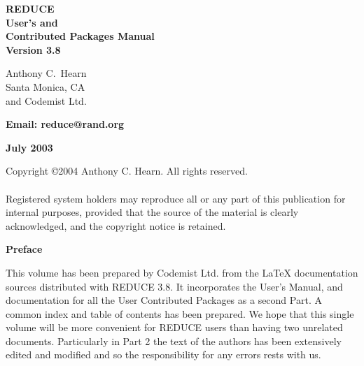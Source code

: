 \documentclass[11pt,letterpaper]{book}
\newcommand{\REDUCE}{REDUCE}
\begin{document}
\pagestyle{empty}

\vspace*{2.0in}
\begin{center}

{\Huge\bf {\REDUCE}} \\ [0.2cm]
{\LARGE\bf User's and \\
  Contributed Packages Manual\vspace{0.4cm} \\
  Version 3.8}

\vspace{0.5in}\large\bf

Anthony C.\ Hearn \\
Santa Monica, CA \\
and Codemist Ltd.

\vspace{0.1in}

\bf Email: reduce@rand.org

\vspace{0.5in}

\large\bf July 2003

\end{center}

\newpage
\vspace*{3.0in}
\noindent Copyright \copyright 2004 Anthony C. Hearn.  All rights reserved. \\
\mbox{}\\
%
\noindent Registered system holders may reproduce all or any part of this
publication for internal purposes, provided that the source of the
material is clearly acknowledged, and the copyright notice is retained.

\newpage

\pagestyle{headings}

\centerline{\bf \large Preface}

This volume has been prepared by Codemist Ltd. from the {\LaTeX}
documentation sources distributed with {\REDUCE} 3.8.  It incorporates
the User's Manual, and documentation for all the User Contributed
Packages as a second Part.  A common index and table of contents has been
prepared.  We hope that this single volume will be more convenient for
{\REDUCE} users than having two unrelated documents.  Particularly in
Part 2 the text of the authors has been extensively edited and
modified and so the responsibility for any errors rests with us.
\end{document}
